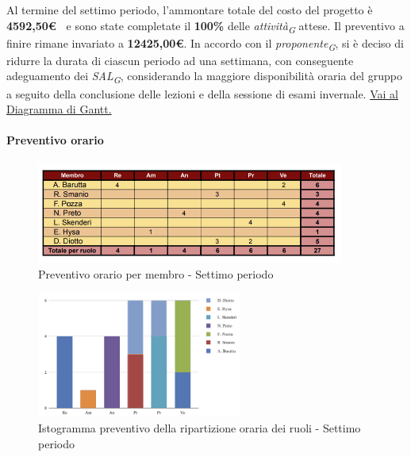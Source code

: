 Al termine del settimo periodo, l'ammontare totale del costo del progetto è \textbf{ 4592,50\euro\ } e sono state completate il \textbf{100\%} delle \textit{attività}\textsubscript{\textit{G}} attese.
Il preventivo a finire rimane invariato a \textbf{12425,00€}.
In accordo con il \textit{proponente}\textsubscript{\textit{G}}, si è deciso di ridurre la durata di ciascun periodo ad una settimana, con conseguente adeguamento dei \textit{SAL}\textsubscript{\textit{G}}, considerando la maggiore disponibilità oraria del gruppo a seguito della conclusione delle lezioni e della sessione di esami invernale.
\href{https://github.com/orgs/ByteOps-swe/projects/3/views/1?sortedBy%5Bdirection%5D=asc&sortedBy%5BcolumnId%5D=64182560}{Vai al Diagramma di Gantt.}

\pagebreak

\paragraph{Preventivo orario}

\begin{figure}[H] 
    \centering
    \includegraphics[width=0.9\textwidth]{../Images/tabPrev7.png}
    \caption{Preventivo orario per membro - Settimo periodo}
    \label{fig:Preventivo_orario_7}
\end{figure}

\vspace{0.6cm}

\begin{figure}[H]
    \centering
    \includegraphics[width=0.6\textwidth]{../Images/graficoConsPrev7.png}
    \caption{Istogramma preventivo della ripartizione oraria dei ruoli - Settimo periodo}
    \label{fig:Preventivo_ripartizione_oraria_7}
\end{figure}


